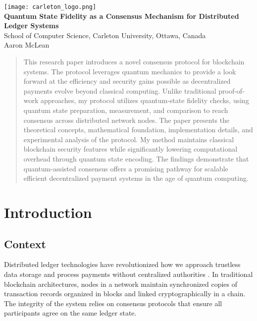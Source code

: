 \documentclass[11pt,a4paper]{article}
\begin{document}
\begin{center}
  \texttt{[image: carleton\_logo.png]}\\[1.5cm]
  {\Large\bfseries Quantum State Fidelity as a Consensus Mechanism for Distributed Ledger Systems}\\[0.3cm]
  {\small School of Computer Science, Carleton University, Ottawa, Canada}\\[1.5cm]
  {\Large Aaron McLean}\\[0.3cm]
\end{center}

\vspace{1.2cm}

\begin{abstract}
\noindent
This research paper introduces a novel consensus protocol for blockchain systems. The protocol leverages quantum mechanics to provide a look forward at the efficiency and security gains possible as decentralized payments evolve beyond classical computing. Unlike traditional proof-of-work approaches, my protocol utilizes quantum-state fidelity checks, using quantum state preparation, measurement, and comparison to reach consensus across distributed network nodes. The paper presents the theoretical concepts, mathematical foundation, implementation details, and experimental analysis of the protocol. My method maintains classical blockchain security features while significantly lowering computational overhead through quantum state encoding. The findings demonstrate that quantum-assisted consensus offers a promising pathway for scalable efficient decentralized payment systems in the age of quantum computing.
\end{abstract}

\newpage
{\footnotesize
\tableofcontents
}
\newpage 


\section{Introduction}

\subsection{Context}
Distributed ledger technologies have revolutionized how we approach trustless data storage and process payments without centralized authorities \cite{investopedia_consensus}. In traditional blockchain architectures, nodes in a network maintain synchronized copies of transaction records organized in blocks and linked cryptographically in a chain. The integrity of the system relies on consensus protocols that ensure all participants agree on the same ledger state.
\end{document}
